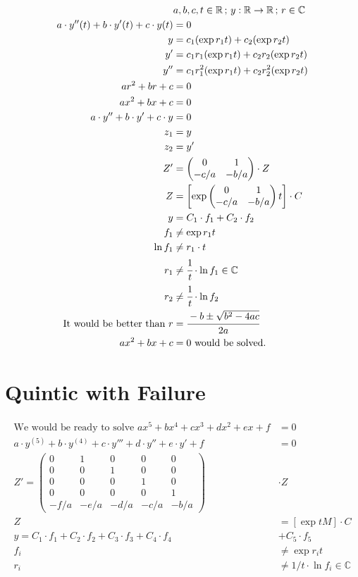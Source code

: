 \documentclass[12pt,a4paper]{article}
\begin{document}
\begin{align}
&a,b,c,t\in \mathbb{R}\,;\,y:\mathbb{R}\to\mathbb{R}\,;\,r\in\mathbb{C} \\
a \cdot y''(t) + b\cdot y'(t) + c\cdot y(t) &= 0 \\
y &= c_1 ( \exp r_1 t) + c_2 ( \exp r_2 t ) \\
y' &= c_1 r_1 ( \exp r_1 t ) + c_2 r_2 (\exp r_2 t)  \\
y'' &= c_1 r_1^2 (\exp r_1 t) + c_2 r_2^2 (\exp r_2 t) \\
ar^2 + br + c &= 0 \\
ax^2 + bx + c &= 0 \\
 a\cdot y'' + b\cdot y' + c\cdot y &= 0 \\
 z_1 &= y \\
 z_2 &= y' \\
 Z' &= \left(\begin{matrix}0 & 1 \\ -c/a & -b/a \end{matrix}\right) \cdot Z \\
 Z &= \left[ \exp \left(\begin{matrix}0 & 1 \\ -c/a & -b/a \end{matrix}\right)t \right] \cdot C \\
 y &= C_1 \cdot f_1 + C_2 \cdot f_2 \\
 f_1 &\ne \exp r_1 t \\
 \ln f_1 &\ne r_1\cdot t \\
 r_1 &\ne \cfrac{1}{t}\cdot \ln f_1 \in \mathbb{C} \\
 r_2 &\ne \cfrac{1}{t}\cdot \ln f_2 \\
 \text{It would be better than  } r &= \cfrac{-b \pm \sqrt{b^2 - 4ac}}{2a} \\
 a x^2 + bx + c &= 0 \text{ would be solved.}
\end{align}

 \section{Quintic with Failure}

\begin{align}
\text{We would be ready to solve }ax^5 + b x^4 + c x^3 + d x^2 + e x + f &= 0 \\
a \cdot y^{(5)} + b \cdot y^{(4)}+ c \cdot y''' + d \cdot y'' + e \cdot y' + f &= 0 \\
 Z' = \left(\begin{matrix}0 & 1 & 0 & 0 & 0 \\ 0 & 0 & 1 & 0 & 0 \\ 0 & 0 & 0 & 1 & 0 \\ 0 & 0 & 0 & 0 & 1  \\ -f/a & -e/a & -d/a & -c/a & -b/a \end{matrix}\right) &\cdot Z \\
 Z &= [\exp tM] \cdot C \\
 y = C_1 \cdot f_1 + C_2 \cdot f_2 + C_3 \cdot f_3 + C_4 \cdot f_4 &+ C_5 \cdot f_5 \\
 f_i &\ne \exp r_i t \\
 r_i &\ne 1/t \cdot \ln f_i \in \mathbb{C}
\end{align}
\end{document}
